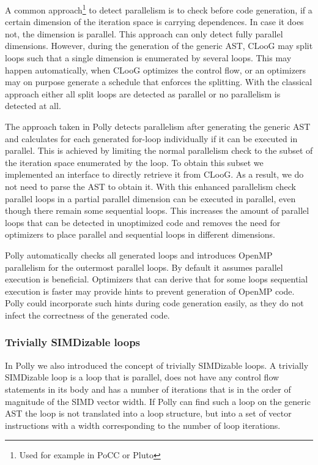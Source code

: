 \documentclass{acm_proc_article-sp}
\begin{document}
A common approach\footnote{Used for example in PoCC or Pluto} to detect
parallelism is to check before code generation, if a certain dimension of the
iteration space is carrying dependences. In case it does not, the dimension is
parallel.  This approach can only detect fully parallel dimensions. However,
during the generation of the generic AST, CLooG may split loops such that a
single dimension is enumerated by several loops.  This may happen
automatically, when CLooG optimizes the control flow, or an optimizers may on
purpose generate a schedule that enforces the splitting.  With the classical
approach either all split loops are detected as parallel or no parallelism is
detected at all.

The approach taken in Polly detects parallelism after generating the generic
AST and calculates for each generated for-loop individually if it can be
executed in parallel. This is achieved by limiting the normal parallelism check
to the subset of the iteration space enumerated by the loop. To obtain this subset
we implemented an interface to directly retrieve it from CLooG. As a result,
we do not need to parse the AST to obtain it. With this enhanced parallelism
check parallel loops in a partial parallel dimension can be executed in
parallel, even though there remain some sequential loops. This increases the
amount of parallel loops that can be detected in unoptimized code and removes
the need for optimizers to place parallel and sequential loops in different
dimensions.

Polly automatically checks all generated loops and introduces OpenMP
parallelism for the outermost parallel loops. By default it assumes parallel
execution is beneficial. Optimizers that can derive that for some loops
sequential execution is faster may provide hints to prevent generation of
OpenMP code. Polly could incorporate such hints during code generation easily,
as they do not infect the correctness of the generated code.


\subsubsection{Trivially SIMDizable loops}
In Polly we also introduced the concept of trivially SIMDizable loops. A
trivially SIMDizable loop is a loop that is parallel, does not have any control
flow statements in its body and has a number of iterations that is in the order of
magnitude of the SIMD vector width. If Polly can find such a loop on the generic AST
the loop is not translated into a loop structure, but into a set of vector
instructions with a width corresponding to the number of loop iterations.
\end{document}
